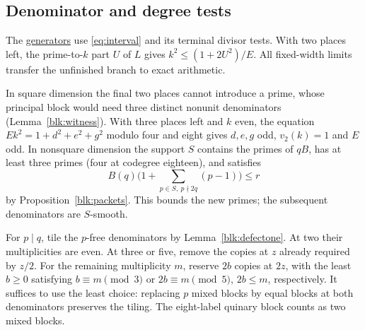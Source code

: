 \documentclass[11pt]{amsart}
\numberwithin{equation}{section}
\theoremstyle{definition}
\theoremstyle{plain}
\newcommand{\supfile}[2]{\href{run:rank-bound-supplement/#1}{#2}}
\begin{document}
\subsection{Denominator and degree tests}
The \supfile{census/run.py}{generators} use \eqref{eq:interval}
and its terminal divisor tests. With two places left, the prime-to-$k$
part $U$ of $L$ gives $k^2\le(1+2U^2)/E$.
All fixed-width limits transfer the unfinished branch to exact arithmetic.

In square dimension the final two places cannot introduce a prime,
whose principal block would need three distinct nonunit denominators
(Lemma~\ref{blk:witness}).
With three places left and $k$ even, the equation
$Ek^2=1+d^2+e^2+g^2$ modulo four and eight gives $d,e,g$ odd,
$v_2(k)=1$ and $E$ odd. In nonsquare dimension the support $S$
contains the primes of $qB$, has at least three primes (four at
codegree eighteen), and satisfies
\[
 B(q)\Big(1+\sum_{p\in S,\ p\nmid2q}(p-1)\Big)\le r
\]
by Proposition~\ref{blk:packets}. This bounds the new primes;
the subsequent denominators are $S$-smooth.

For $p\mid q$, tile the $p$-free denominators by
Lemma~\ref{blk:defectone}. At two their multiplicities are even.
At three or five, remove the copies at $z$ already required by
$z/2$. For the remaining multiplicity $m$, reserve $2b$ copies
at $2z$, with the least $b\ge0$ satisfying
$b\equiv m\pmod3$ or $2b\equiv m\pmod5$, $2b\le m$,
respectively. It suffices to use the least choice: replacing $p$
mixed blocks by equal blocks at both denominators preserves the
tiling. The eight-label quinary block counts as two mixed blocks.
\end{document}

